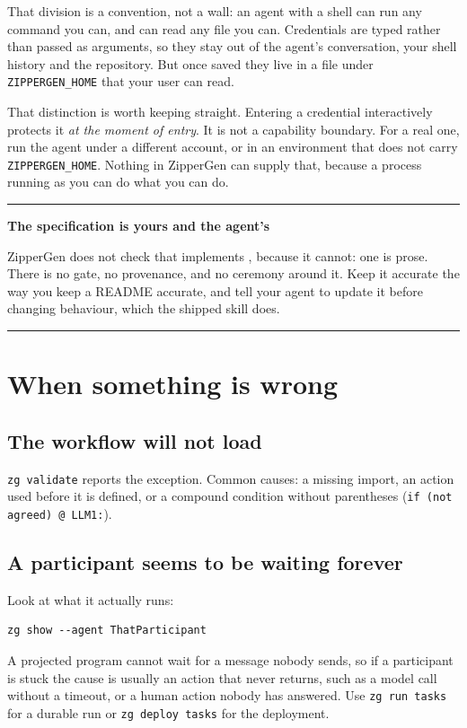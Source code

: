 \documentclass[11pt,a4paper]{article}
\newenvironment{notebox}[1]
{\begin{center}\begin{minipage}{0.94\linewidth}
 \color{ZipperInk}\hrule\vspace{5pt}\textbf{#1}\par\smallskip}
{\vspace{5pt}\hrule\end{minipage}\end{center}}
\begin{document}
That division is a convention, not a wall: an agent with a shell can run any
command you can, and can read any file you can. Credentials are typed rather
than passed as arguments, so they stay out of the agent's conversation, your
shell history and the repository. But once saved they live in a file under
\texttt{ZIPPERGEN\_HOME} that your user can read.

That distinction is worth keeping straight. Entering a credential
interactively protects it \emph{at the moment of entry}. It is not a capability
boundary. For a real one, run the agent under a different account, or in an
environment that does not carry \texttt{ZIPPERGEN\_HOME}. Nothing in ZipperGen
can supply that, because a process running as you can do what you can do.

\begin{notebox}{The specification is yours and the agent's}
ZipperGen does not check that  implements
, because it cannot: one is prose. There is no gate, no
provenance, and no ceremony around it. Keep it accurate the way you keep a
README accurate, and tell your agent to update it before changing behaviour,
which the shipped skill does.
\end{notebox}

\section{When something is wrong}

\subsection{The workflow will not load}

\texttt{zg validate} reports the exception. Common causes: a missing import,
an action used before it is defined, or a compound condition without
parentheses (\texttt{if (not agreed) @ LLM1:}).

\subsection{A participant seems to be waiting forever}

Look at what it actually runs:

\begin{lstlisting}[style=shell]
zg show --agent ThatParticipant
\end{lstlisting}

A projected program cannot wait for a message nobody sends, so if a participant
is stuck the cause is usually an action that never returns, such as a model call
without a timeout, or a human action nobody has answered. Use \texttt{zg run
tasks} for a durable run or \texttt{zg deploy tasks} for the deployment.
\end{document}
